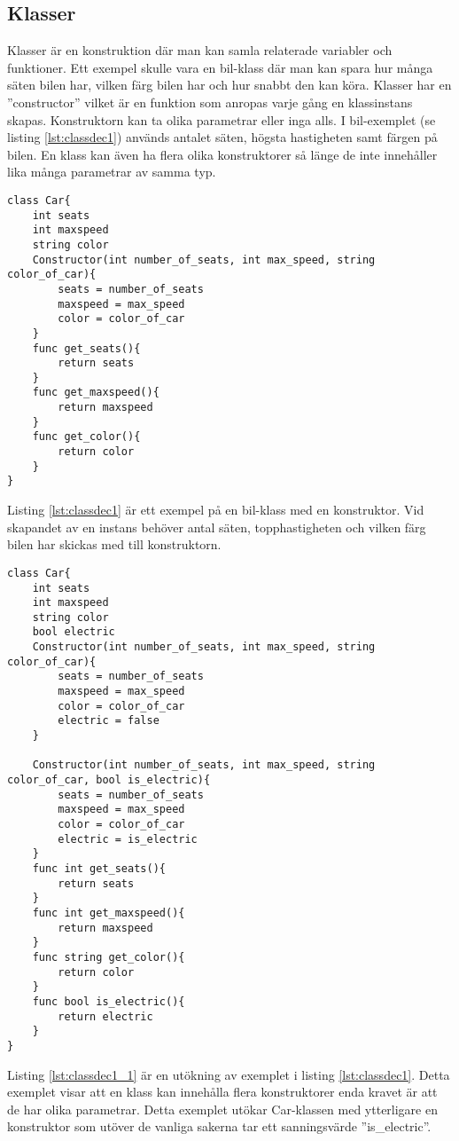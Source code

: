 \documentclass{TDP003mall}
\begin{document}
\subsection{Klasser}
Klasser är en konstruktion där man kan samla relaterade variabler och funktioner. Ett exempel skulle vara en bil-klass där man kan spara hur många säten bilen har, vilken färg bilen har och hur snabbt den kan köra. Klasser har en ''constructor'' vilket är en funktion som anropas varje gång en klassinstans skapas. Konstruktorn kan ta olika parametrar eller inga alls. I bil-exemplet (se listing \ref{lst:classdec1}) används antalet säten, högsta hastigheten samt färgen på bilen. 
En klass kan även ha flera olika konstruktorer så länge de inte innehåller lika många parametrar av samma typ.
\begin{lstlisting}[caption=Klass-deklaration-exempel, label=lst:classdec1]
class Car{
    int seats
    int maxspeed
    string color
    Constructor(int number_of_seats, int max_speed, string color_of_car){
        seats = number_of_seats
        maxspeed = max_speed
        color = color_of_car
    }
    func get_seats(){
        return seats
    }
    func get_maxspeed(){
        return maxspeed
    }
    func get_color(){
        return color
    }
}
\end{lstlisting}
Listing \ref{lst:classdec1} är ett exempel på en bil-klass med en konstruktor.
Vid skapandet av en instans behöver antal säten, topphastigheten och vilken färg bilen har skickas med till konstruktorn.

\newpage

\begin{lstlisting}[caption=Klass-deklaration-exempel med flera konstruktorer, label=lst:classdec1_1]
class Car{
    int seats
    int maxspeed
    string color
    bool electric
    Constructor(int number_of_seats, int max_speed, string color_of_car){
        seats = number_of_seats
        maxspeed = max_speed
        color = color_of_car
        electric = false
    }
    
    Constructor(int number_of_seats, int max_speed, string color_of_car, bool is_electric){
        seats = number_of_seats
        maxspeed = max_speed
        color = color_of_car
        electric = is_electric
    }
    func int get_seats(){
        return seats
    }
    func int get_maxspeed(){
        return maxspeed
    }
    func string get_color(){
        return color
    }
    func bool is_electric(){
        return electric
    }
}
\end{lstlisting}
Listing \ref{lst:classdec1_1} är en utökning av exemplet i listing \ref{lst:classdec1}.
Detta exemplet visar att en klass kan innehålla flera konstruktorer enda kravet är att de har olika parametrar.
Detta exemplet utökar Car-klassen med ytterligare en konstruktor som utöver de vanliga sakerna tar ett sanningsvärde ''is\_electric''.
\end{document}

